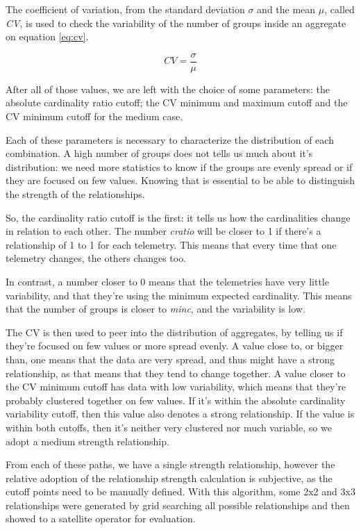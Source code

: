 The coefficient of variation, from the standard deviation \(\sigma\) and the mean \(\mu\), called \emph{CV}, is used to check the variability of the number of groups inside an aggregate on equation \ref{eq:cv}.

\begin{equation} \label{eq:cv}
    CV = \frac{\sigma}{\mu}
\end{equation}

After all of those values, we are left with the choice of some parameters: the absolute cardinality ratio cutoff; the CV minimum and maximum cutoff and the CV minimum cutoff for the medium case.

Each of these parameters is necessary to characterize the distribution of each combination.
A high number of groups does not tells us much about it's distribution: we need more statistics to know if the groups are evenly spread or if they are focused on few values.
Knowing that is essential to be able to distinguish the strength of the relationships.

So, the cardinality ratio cutoff is the first: it tells us how the cardinalities change in relation to each other.
The number \emph{cratio} will be closer to 1 if there's a relationship of 1 to 1 for each telemetry. This means that every time that one telemetry changes, the others changes too.

In contrast, a number closer to 0 means that the telemetries have very little variability, and that they're using the minimum expected cardinality.
This means that the number of groups is closer to \emph{minc}, and the variability is low.

The CV is then used to peer into the distribution of aggregates, by telling us if they're focused on few values or more spread evenly.
A value close to, or bigger than, one means that the data are very spread, and thus might have a strong relationship, as that means that they tend to change together.
A value closer to the CV minimum cutoff has data with low variability, which means that they're probably clustered together on few values.
If it's within the absolute cardinality variability cutoff, then this value also denotes a strong relationship.
If the value is within both cutoffs, then it's neither very clustered nor much variable, so we adopt a medium strength relationship.

From each of these paths, we have a single strength relationship, however the relative adoption of the relationship strength calculation is subjective, as the cutoff points need to be manually defined.
With this algorithm, some 2x2 and 3x3 relationships were generated by grid searching all possible relationships and then showed to a satellite operator for evaluation.


